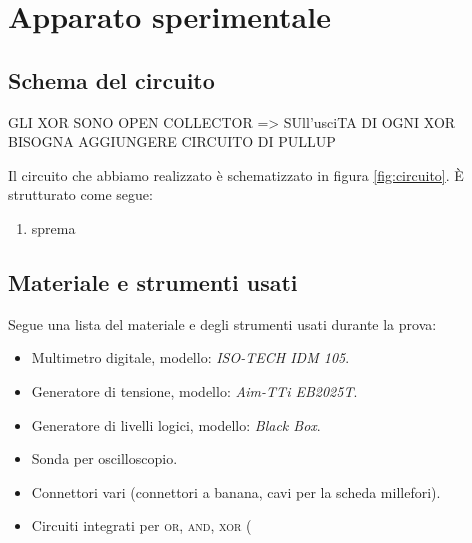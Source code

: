 \section{Apparato sperimentale}\label{sec:apparato-sperimentale}
\subsection{Schema del circuito}\label{subsec:schema-circuito}

GLI XOR SONO OPEN COLLECTOR => SUll'usciTA DI OGNI XOR BISOGNA AGGIUNGERE CIRCUITO DI PULLUP


Il circuito che abbiamo realizzato è schematizzato in figura \ref{fig:circuito}.
È strutturato come segue:
\begin{enumerate}
  \item%
  sprema %
\end{enumerate}

\subsection{Materiale e strumenti usati}\label{subsec:materiali}
Segue una lista del materiale e degli strumenti usati durante la prova:
\begin{itemize}
  \item%
  Multimetro digitale, modello: \emph{ISO-TECH IDM 105}.
  \item%
  Generatore di tensione, modello: \emph{Aim-TTi EB2025T}.
  \item%
  Generatore di livelli logici, modello: \emph{Black Box}. %
  \item%
  Sonda per oscilloscopio.
  \item%
  Connettori vari (connettori a banana, cavi per la scheda millefori).
  \item%
  Circuiti integrati per \textsc{or}, \textsc{and}, \textsc{xor} (%

\end{itemize}
